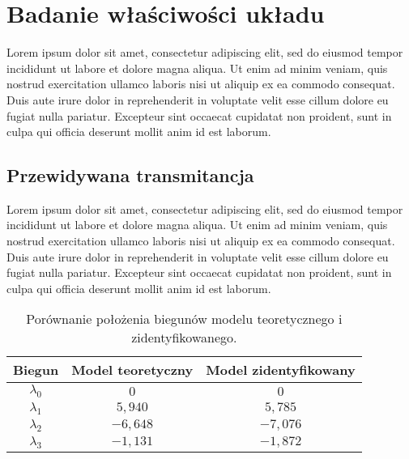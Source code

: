\chapter{Badanie właściwości układu} 
Lorem ipsum dolor sit amet, consectetur adipiscing elit, sed do eiusmod tempor incididunt ut labore et dolore magna aliqua. Ut enim ad minim veniam, quis nostrud exercitation ullamco laboris nisi ut aliquip ex ea commodo consequat. Duis aute irure dolor in reprehenderit in voluptate velit esse cillum dolore eu fugiat nulla pariatur. Excepteur sint occaecat cupidatat non proident, sunt in culpa qui officia deserunt mollit anim id est laborum.

\section{Przewidywana transmitancja}
Lorem ipsum dolor sit amet, consectetur adipiscing elit, sed do eiusmod tempor incididunt ut labore et dolore magna aliqua. Ut enim ad minim veniam, quis nostrud exercitation ullamco laboris nisi ut aliquip ex ea commodo consequat. Duis aute irure dolor in reprehenderit in voluptate velit esse cillum dolore eu fugiat nulla pariatur. Excepteur sint occaecat cupidatat non proident, sunt in culpa qui officia deserunt mollit anim id est laborum.
\begin{table}[H]
	\caption{Porównanie położenia biegunów modelu teoretycznego i zidentyfikowanego.}
	\label{bieguny_porownanie}
	\centering
	\begin{tabular}{|c|c|c|}
		\hline 
		Biegun & Model teoretyczny & Model zidentyfikowany 	\\
		\hline
	$\lambda_{0}$							& $0$ 				& $0$ 				\\	\hline
 	$\lambda_{1}$							& $5,940$			& $5,785$			\\	\hline
	$\lambda_{2}$							& $-6,648$			& $-7,076$			\\	\hline
	$\lambda_{3}$ 							& $-1,131$			& $-1,872$			\\ 	\hline
	\end{tabular} 
\end{table}
